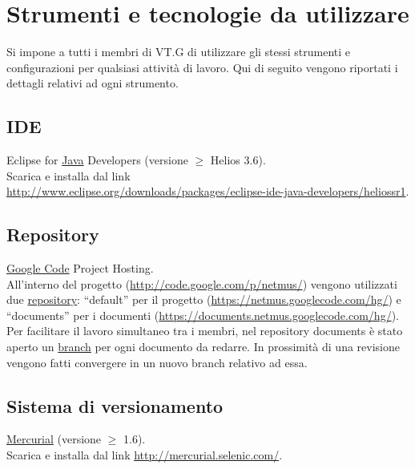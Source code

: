 \chapter{Strumenti e tecnologie da utilizzare}
\thispagestyle{fancy}
Si impone a tutti i membri di VT.G di utilizzare gli stessi strumenti e
configurazioni per qualsiasi attivit\`a di lavoro. Qui di seguito vengono
riportati i dettagli relativi ad ogni strumento.

\section{IDE}
Eclipse for \underline{Java} Developers (versione $\geq$ Helios 3.6).
\\
Scarica e installa dal link\\
\url{http://www.eclipse.org/downloads/packages/eclipse-ide-java-developers/heliossr1}.
 
\section{Repository}
\underline{Google Code} Project Hosting.
\\
All'interno del progetto (\url{http://code.google.com/p/netmus/}) vengono
utilizzati due \underline{repository}: ``default'' per il progetto
(\url{https://netmus.googlecode.com/hg/}) e ``documents'' per i documenti
(\url{https://documents.netmus.googlecode.com/hg/}).\\
Per facilitare il lavoro simultaneo tra i membri, nel repository documents \`e
stato aperto un \underline{branch} per ogni documento da redarre. In prossimit\`a di una
revisione vengono fatti convergere in un nuovo branch relativo ad essa.

\section{Sistema di versionamento}
\underline{Mercurial}  (versione $\geq$ 1.6). 
\\
Scarica e installa dal link
\url{http://mercurial.selenic.com/}.

